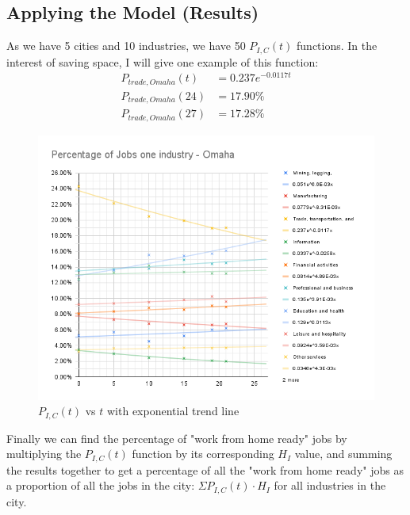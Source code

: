         \subsection{Applying the Model (Results)}  
            As we have 5 cities and 10 industries, we have 50 $P_{I,C}(t)$ functions. In the interest of saving space, I will give one example of this function:
            \begin{align}
            P_{trade,Omaha}(t) &= 0.237e^{-0.0117t} \\
            P_{trade,Omaha}(24) &= 17.90\% \\
            P_{trade,Omaha}(27) &= 17.28\% 
            \end{align}
            \begin{figure}[H]
                  \includegraphics[width=\linewidth]{images/BEAB97A6-07C9-45F9-8B49-E371557909FE.png}
                  \caption{$P_{I,C}(t)$ vs $t$ with exponential trend line}
                  \label{fig:chart3}
                \end{figure}
                
            Finally we can find the percentage of "work from home ready" jobs by multiplying the $P_{I,C}(t)$ function by its corresponding $H_I$ value, and summing the results together to get a percentage of all the "work from home ready" jobs as a proportion of all the jobs in the city: $\Sigma P_{I,C}(t)\cdot H_I$ for all industries in the city.
                
